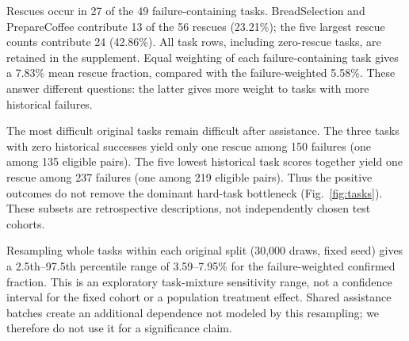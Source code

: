 Rescues occur in 27 of the 49 failure-containing tasks. BreadSelection and PrepareCoffee contribute 13 of the 56 rescues (23.21\%); the five largest rescue counts contribute 24 (42.86\%). All task rows, including zero-rescue tasks, are retained in the supplement. Equal weighting of each failure-containing task gives a 7.83\% mean rescue fraction, compared with the failure-weighted 5.58\%. These answer different questions: the latter gives more weight to tasks with more historical failures.

The most difficult original tasks remain difficult after assistance. The three tasks with zero historical successes yield only one rescue among 150 failures (one among 135 eligible pairs). The five lowest historical task scores together yield one rescue among 237 failures (one among 219 eligible pairs). Thus the positive outcomes do not remove the dominant hard-task bottleneck (Fig.~\ref{fig:tasks}). These subsets are retrospective descriptions, not independently chosen test cohorts.

Resampling whole tasks within each original split (30,000 draws, fixed seed) gives a 2.5th--97.5th percentile range of 3.59--7.95\% for the failure-weighted confirmed fraction. This is an exploratory task-mixture sensitivity range, not a confidence interval for the fixed cohort or a population treatment effect. Shared assistance batches create an additional dependence not modeled by this resampling; we therefore do not use it for a significance claim.
